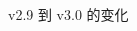 \begin{frame}
\begin{figure}
\begin{columns}[c]
\begin{column}{0.26\textwidth}
      \end{column}
      \hfill\hfill
    \end{columns}
    \caption{\SJTUBeamer{} v2.9 到 v3.0 的变化}
  \end{figure}
\end{frame}

